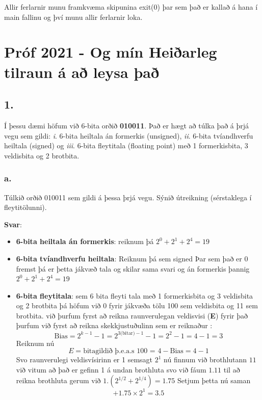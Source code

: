 \documentclass{article}
\begin{document}
Allir ferlarnir munu framkvæma skipunina exit(0) þar sem það er kallað á hana í main fallinu og því munu allir ferlarnir loka.

\newpage

\section{Próf 2021 - Og mín Heiðarleg tilraun á að leysa það}

\subsection{1.} Í þessu dæmi höfum við 6-bita orðið \textbf{010011}. Það er hægt að túlka það á þrjá vegu
sem gildi: \textit{i}. 6-bita heiltala án formerkis (unsigned), \textit{ii}. 6-bita tvíandhverfu heiltala
(signed) og \textit{iii}. 6-bita fleytitala (floating point) með 1 formerkisbita, 3 veldisbita og 2
brotbita.

\subsubsection{a.}Túlkið orðið 010011 sem gildi á þessa þrjá vegu. Sýnið útreikning (sérstaklega
í fleytitölunni).

\textbf{Svar}:

\begin{itemize}
    \item \textbf{6-bita heiltala án formerkis}: reiknum þá $2^0+2^1+2^4 = 19 $ 
    \item \textbf{6-bita tvíandhverfu heiltala}: Reiknum þá sem signed Þar sem það er 0 fremst þá er þetta jákvæð tala og skilar sama svari 
                                                 og án formerkis þannig $2^0+2^1+2^4 = 19$ 
    \item \textbf{6-bita fleytitala}: sem 6 bita fleyti tala með 1 formerkisbita og 3 veldisbita og 2 brotbita þá höfum við 0 fyrir jákvæða tölu
                                      100 sem veldisbita og 11 sem brotbita. við þurfum fyrst að reikna raunverulegan veldisvisi (\textbf{E})
                                      fyrir það þurfum við fyrst að reikna skekkjustuðulinn sem er reiknaður :
                                      \[\text{Bias} = 2^{k-1}-1= 2^{3\text{(bitar)}-1}-1 = 2^2-1 = 4 - 1= 3\]
                                      Reiknum nú \[E = \text{bitagildið þ.e.a.s 100 = 4} - \text{Bias} = 4-1 \]
                                      Svo raunverulegi veldisvísirinn er 1 semsagt $2^1$
                                      nú finnum við brothlutann $11$ við vitum að það er gefinn 1 á undan brothluta svo við fáum $1.11$ 
                                      til að reikna brothluta gerum við $1.(2^{1/2}+2^{1/4}) = 1.75$
                                      Setjum þetta nú saman \[ + 1.75 \times 2^1 = 3.5\]                                
\end{itemize}
\end{document}
